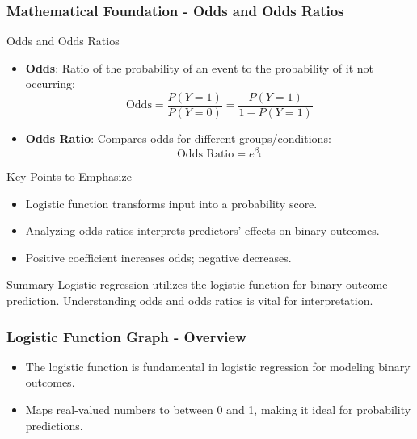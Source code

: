 \documentclass[aspectratio=169]{beamer}
\begin{document}
\begin{frame}[fragile]
    \frametitle{Mathematical Foundation - Odds and Odds Ratios}
    \begin{block}{Odds and Odds Ratios}
        \begin{itemize}
            \item \textbf{Odds}: Ratio of the probability of an event to the probability of it not occurring:
            \[
            \text{Odds} = \frac{P(Y=1)}{P(Y=0)} = \frac{P(Y=1)}{1 - P(Y=1)}
            \]
            \item \textbf{Odds Ratio}: Compares odds for different groups/conditions:
            \[
            \text{Odds Ratio} = e^{\beta_1}
            \]
        \end{itemize}
    \end{block}
    \begin{block}{Key Points to Emphasize}
        \begin{itemize}
            \item Logistic function transforms input into a probability score.
            \item Analyzing odds ratios interprets predictors' effects on binary outcomes.
            \item Positive coefficient increases odds; negative decreases.
        \end{itemize}
    \end{block}
    \begin{block}{Summary}
        Logistic regression utilizes the logistic function for binary outcome prediction. Understanding odds and odds ratios is vital for interpretation.
    \end{block}
\end{frame}

\begin{frame}[fragile]
    \frametitle{Logistic Function Graph - Overview}
    \begin{itemize}
        \item The logistic function is fundamental in logistic regression for modeling binary outcomes.
        \item Maps real-valued numbers to between 0 and 1, making it ideal for probability predictions.
    \end{itemize}
\end{frame}
\end{document}
